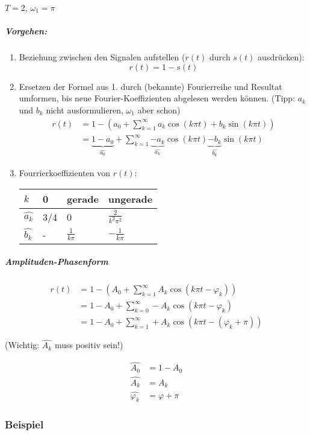 $T=2$, $\omega_1 = \pi$

\subparagraph{Vorgehen:}
\begin{enumerate}
	\item Beziehung zwischen den Signalen aufstellen ($r(t)$ durch $s(t)$ ausdrücken): \[
			r(t) = 1-s(t)  
		\]
	\item Ersetzen der Formel aus 1. durch (bekannte) Fourierreihe und Resultat umformen, bis neue Fourier-Koeffizienten abgelesen werden können. (Tipp: $a_k$ und $b_k$ nicht ausformulieren, $\omega_1$ aber schon) \begin{align*}
			r(t) &= 1- \left( a_0 + \sum^\infty_{k=1} a_k \cos(k \pi t) + b_k \sin(k \pi t)\right) \\
			&= \underbrace{1 - a_0}_{\widehat{a_0}} + \sum^\infty_{k=1} \underbrace{-a_k}_{\widehat{a_k}} \cos(k \pi t) \underbrace{- b_k}_{\widehat{b_k}} \sin(k \pi t)
		\end{align*}
	\item Fourrierkoeffizienten von $r(t)$: 

	 {\tabulinesep=1.2mm
	  \begin{tabu}{l | l | l | l}
			$k$ & 0 & gerade & ungerade \\ \hline
			$\widehat{a_k}$ & 3/4 & 0 & $\frac{2}{k^2 \pi^2}$ \\ \hline
			$\widehat{b_k}$ & - & $\frac{1}{k \pi}$ & $-\frac{1}{k \pi}$
		\end{tabu}
		}
\end{enumerate}

\subparagraph{Amplituden-Phasenform}


\begin{align*}
	r(t) &= 1 - \left( A_0 + \sum^\infty_{k=1} A_k \cos(k \pi t - \varphi_k) \right) \\
		&= 1 - A_0 + \sum^\infty_{k=0} - A_k \cos(k \pi t - \varphi_k) \\
		&= 1 - A_0 + \sum^\infty_{k=1} + A_k \cos(k \pi t - (\varphi_k + \pi))
\end{align*}

(Wichtig: $\widehat{A_k}$ muss positiv sein!)

\begin{align*}
	\widehat{A_0} &= 1 - A_0 \\
	\widehat{A_k} &= A_k \\
	\widehat{\varphi_k} &= \varphi + \pi
\end{align*}


\subsubsection{Beispiel}


